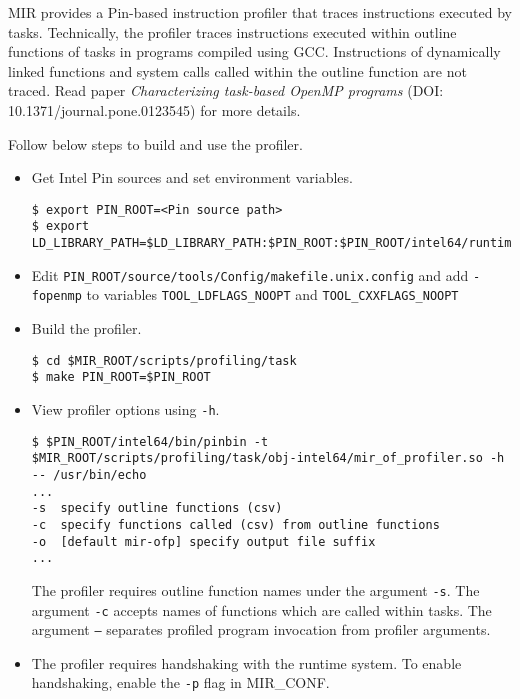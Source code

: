 \documentclass[11pt,a4paper]{article}
\begin{document}
MIR provides a Pin-based instruction profiler that traces instructions executed by tasks. Technically, the profiler traces instructions executed within outline functions of tasks in programs compiled using GCC. Instructions of dynamically linked functions and system calls called within the outline function are not traced. Read paper \textit{Characterizing task-based OpenMP programs} (DOI: 10.1371/journal.pone.0123545) for more details.

Follow below steps to build and use the profiler.

\begin{itemize}
\item Get Intel Pin sources and set environment variables.

\begin{lstlisting}[style=MyInputStyle]
$ export PIN_ROOT=<Pin source path>
$ export LD_LIBRARY_PATH=$LD_LIBRARY_PATH:$PIN_ROOT:$PIN_ROOT/intel64/runtime
\end{lstlisting}

\item Edit \texttt{PIN\_ROOT/source/tools/Config/makefile.unix.config} and add \texttt{-fopenmp} to variables \texttt{TOOL\_LDFLAGS\_NOOPT}  and \texttt{TOOL\_CXXFLAGS\_NOOPT}

\item Build the profiler.

\begin{lstlisting}[style=MyInputStyle]
$ cd $MIR_ROOT/scripts/profiling/task
$ make PIN_ROOT=$PIN_ROOT
\end{lstlisting}

\item View profiler options using \texttt{-h}.

\begin{lstlisting}[style=MyInputStyle]
$ $PIN_ROOT/intel64/bin/pinbin -t $MIR_ROOT/scripts/profiling/task/obj-intel64/mir_of_profiler.so -h -- /usr/bin/echo
...
-s  specify outline functions (csv)
-c  specify functions called (csv) from outline functions
-o  [default mir-ofp] specify output file suffix
...
\end{lstlisting}

The profiler requires outline function names under the argument \texttt{-s}. The argument \texttt{-c} accepts names of functions which are called within tasks. The argument \texttt{--} separates profiled program invocation from profiler arguments.

\item The profiler requires handshaking with the runtime system. To enable handshaking, enable the \texttt{-p} flag in MIR\_CONF.


\end{itemize}
\end{document}
